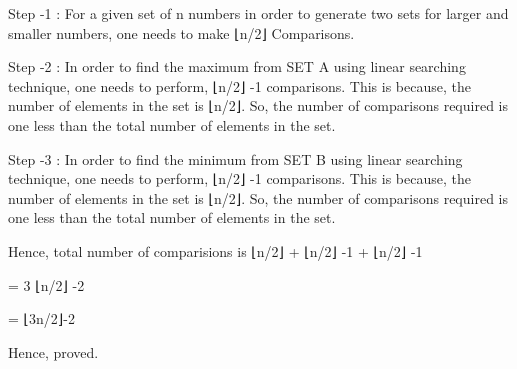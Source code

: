 \documentclass[letterpaper,portrait,12pt]{article}
\begin{document}
\begin{flushleft}
Step -1 : For a given set of n numbers in order to generate two sets for larger and smaller numbers, one needs to make ⌊n/2⌋ Comparisons.
\end{flushleft}


\begin{flushleft}

\end{flushleft}


\begin{flushleft}
Step -2 :  In order to find the maximum from SET A using linear searching technique, one needs to perform, ⌊n/2⌋ -1 comparisons. This is because, the number of elements in the set is ⌊n/2⌋. So, the number of comparisons required is one less than the total number of elements in the set.
\end{flushleft}


\begin{flushleft}

\end{flushleft}


\begin{flushleft}
Step -3 :  In order to find the minimum from SET B using linear searching technique, one needs to perform, ⌊n/2⌋ -1 comparisons. This is because, the number of elements in the set is ⌊n/2⌋. So, the number of comparisons required is one less than the total number of elements in the set.
\end{flushleft}


\begin{flushleft}

\end{flushleft}


\begin{flushleft}
Hence, total number of comparisions is  ⌊n/2⌋ +  ⌊n/2⌋ -1 +  ⌊n/2⌋ -1 
\end{flushleft}


\begin{flushleft}
= 3 ⌊n/2⌋ -2
\end{flushleft}


\begin{flushleft}
= ⌊3n/2⌋-2
\end{flushleft}


\begin{flushleft}
 
\end{flushleft}


\begin{flushleft}
Hence, proved.
\end{flushleft}
\end{document}
